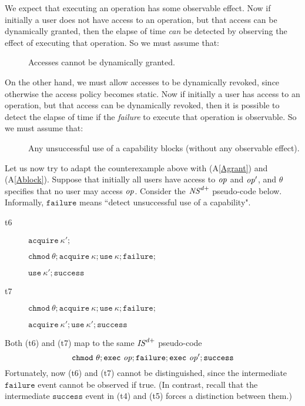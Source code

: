 \documentclass[10pt]{article}
\makeatletter
\newcounter{Cassums}
\newcommand{\op}{{\it op}}
\newcommand{\A}{\addtocounter{Cassums}{1}A\arabic{Cassums}\gdef\@currentlabel{\arabic{Cassums}}}
\makeatother
\begin{document}
We expect that executing an operation has some observable effect. Now if initially a user does not have access to an operation, but that access can be dynamically granted, then the elapse of time \emph{can} be detected by observing the effect of executing that operation. So we must assume that:
\begin{description}
\item[\A]\label{Agrant} Accesses cannot be dynamically granted.
\end{description}
On the other hand, we must allow accesses to be dynamically revoked, since otherwise the access policy becomes static. Now if initially a user has access to an operation, but that access can be dynamically revoked, then it is possible to detect the elapse of time if the \emph{failure} to execute that operation is observable. So we must assume that:
\begin{description}
\item[\A]\label{Ablock} Any unsuccessful use of a capability blocks (without any observable effect).
\end{description}
Let us now try to adapt the counterexample above with (A\ref{Agrant}) and (A\ref{Ablock}). Suppose that initially all users have access to $\op$ and $\op'$, and $\theta$ specifies that no user may access $\op$. Consider the ${\it NS}^{d+}$ pseudo-code below. Informally, $\mathtt{failure}$ means ``detect unsuccessful use of a capability". 
\begin{description}
\item[t6] $\mathtt{acquire}~\kappa';$

$\!\!\!\!\mathtt{chmod}~\theta; \mathtt{acquire}~\kappa; \mathtt{use}~\kappa; \mathtt{failure};$

$\!\!\!\!\mathtt{use}~\kappa'; \mathtt{success}$
\item[t7] $\mathtt{chmod}~\theta; \mathtt{acquire}~\kappa; \mathtt{use}~\kappa; \mathtt{failure}; $

$\!\!\!\!\mathtt{acquire}~\kappa';\mathtt{use}~\kappa'; \mathtt{success}$
\end{description}
Both (t6) and (t7) map to the same ${\it IS}^{d+}$ pseudo-code $$\mathtt{chmod}~\theta; \mathtt{exec}~\op; \mathtt{failure}; \mathtt{exec}~\op'; \mathtt{success}$$
Fortunately, now (t6) and (t7) cannot be distinguished, since the intermediate $\mathtt{failure}$ event cannot be observed if true. (In contrast, recall that the intermediate $\mathtt{success}$ event in (t4) and (t5) forces a distinction between them.)
\end{document}
